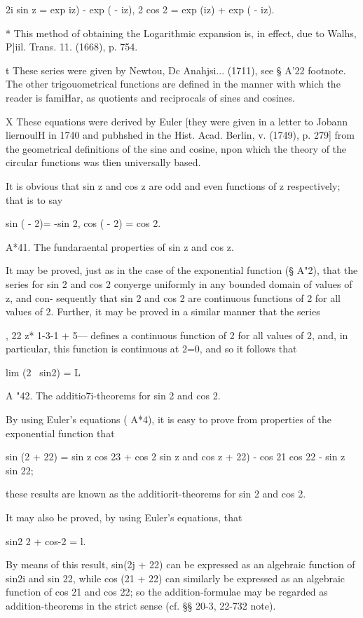 2i sin z = exp iz) - exp ( - iz), 2 cos 2 = exp (iz) + exp ( - iz).

* This method of obtaining the Logarithmic expansion is, in effect,
due to Walhs, P]iil. Trans. 11. (1668), p. 754.

t These series were given by Newtou, Dc Anahjsi... (1711), see § A'22
footnote. The other trigouometrical functions are defined in the
manner with which the reader is famiHar, as quotients and reciprocals
of sines and cosines.

X These equations were derived by Euler [they were given in a letter
to Jobann liernoulH in 1740 and pubhshed in the Hist. Acad. Berlin, v.
(1749), p. 279] from the geometrical definitions of the sine and
cosine, npon which the theory of the circular functions was tlien
universally based.

%
%

It is obvious that sin z and cos z are odd and even functions of z
respectively; that is to say

sin ( - 2)= -sin 2, cos ( - 2) = cos 2.

A*41. The fundaraental properties of sin z and cos z.

It may be proved, just as in the case of the exponential function (§
A"2), that the series for sin 2 and cos 2 conyerge uniformly in any
bounded domain of values of z, and con- sequently that sin 2 and cos 2
are continuous functions of 2 for all values of 2. Further, it may be
proved in a similar manner that the series

, 22 z* 1-3-1 + 5--- defines a continuous function of 2 for all values
of 2, and, in particular, this function is continuous at 2=0, and so
it follows that

lim (2~ sin2) = L

A "42. The additio7i-theorems for sin 2 and cos 2.

By using Euler's equations ( A*4), it is easy to prove from properties
of the exponential function that

sin (2 + 22) = sin z cos 23 + cos 2 sin z and cos z + 22) - cos 21 cos
22 - sin z sin 22;

these results are known as the additiorit-theorems for sin 2 and cos
2.

It may also be proved, by using Euler's equations, that

sin2 2 + cos-2 = l.

By means of this result, sin(2j + 22) can be expressed as an algebraic
function of sin2i and sin 22, while cos (21 + 22) can similarly be
expressed as an algebraic function of cos 21 and cos 22; so the
addition-formulae may be regarded as addition-theorems in the strict
sense (cf. §§ 20-3, 22-732 note).

